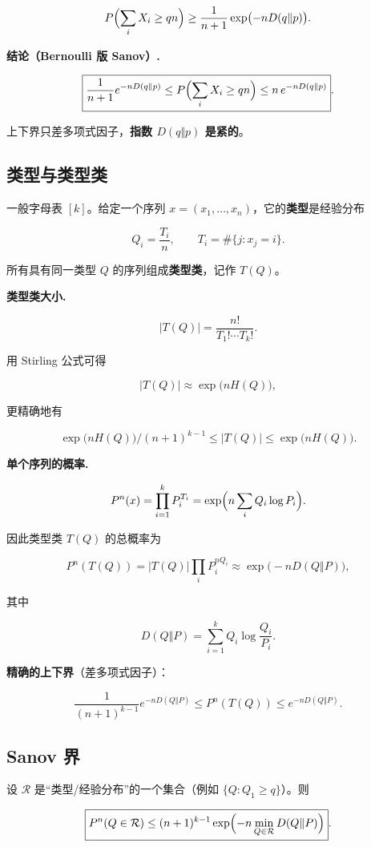\[
P\Bigl(\sum_iX_i\ge qn\Bigr)
\ge\frac1{n+1}\exp\bigl(-nD(q\Vert p)\bigr).
\]

\textbf{结论（Bernoulli 版 Sanov）.}

\[
\boxed{
\frac1{n+1}e^{-nD(q\Vert p)}
\le
P\Bigl(\sum_iX_i\ge qn\Bigr)
\le
n\,e^{-nD(q\Vert p)}
}.
\]

上下界只差多项式因子，\textbf{指数 $D(q\Vert p)$ 是紧的}。

\subsection{类型与类型类}


一般字母表 $[k]$。给定一个序列 $x=(x_1,\dots,x_n)$，它的\textbf{类型}是经验分布

\[
Q_i=\frac{T_i}{n},\qquad T_i=\#\{j:x_j=i\}.
\]

所有具有同一类型 $Q$ 的序列组成\textbf{类型类}，记作 $T(Q)$。

\textbf{类型类大小.}

\[
|T(Q)|=\frac{n!}{T_1!\cdots T_k!}.
\]

用 Stirling 公式可得

\[
|T(Q)|\approx\exp\bigl(nH(Q)\bigr),
\]

更精确地有

\[
\exp\bigl(nH(Q)\bigr)\big/(n+1)^{k-1}
\le |T(Q)|
\le \exp\bigl(nH(Q)\bigr).
\]

\textbf{单个序列的概率.}

\[
P^n(x)=\prod_{i=1}^kP_i^{T_i}
=\exp\Bigl(n\sum_iQ_i\log P_i\Bigr).
\]

因此类型类 $T(Q)$ 的总概率为

\[
P^n(T(Q))
=|T(Q)|\prod_iP_i^{nQ_i}
\approx\exp\bigl(-nD(Q\Vert P)\bigr),
\]

其中

\[
D(Q\Vert P)=\sum_{i=1}^kQ_i\log\frac{Q_i}{P_i}.
\]

\textbf{精确的上下界}（差多项式因子）：

\[
\frac{1}{(n+1)^{k-1}}e^{-nD(Q\Vert P)}
\le P^n(T(Q))
\le e^{-nD(Q\Vert P)}.
\]

\subsection{Sanov 界}


设 $\mathcal R$ 是“类型/经验分布”的一个集合（例如 $\{Q:Q_1\ge q\}$）。则

\[
\boxed{
P^n(Q\in\mathcal R)
\le (n+1)^{k-1}
\exp\Bigl(-n\min_{Q\in\mathcal R}D(Q\Vert P)\Bigr)
}.
\]

